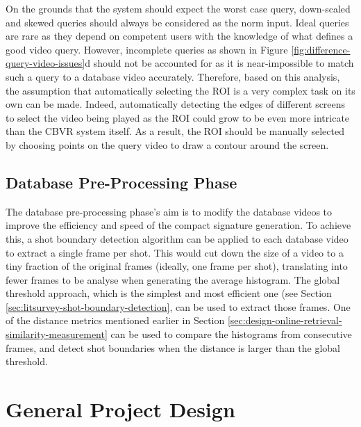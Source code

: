 On the grounds that the system should expect the worst case query, down-scaled and skewed queries should always be considered as the norm input. Ideal queries are rare as they depend on competent users with the knowledge of what defines a good video query. However, incomplete queries as shown in Figure \ref{fig:difference-query-video-issues}d should not be accounted for as it is near-impossible to match such a query to a database video accurately. Therefore, based on this analysis, the assumption that automatically selecting the ROI is a very complex task on its own can be made. Indeed, automatically detecting the edges of different screens to select the video being played as the ROI could grow to be even more intricate than the CBVR system itself. As a result, the ROI should be manually selected by choosing points on the query video to draw a contour around the screen. 


\subsection{Database Pre-Processing Phase}

The database pre-processing phase's aim is to modify the database videos to improve the efficiency and speed of the compact signature generation. To achieve this, a shot boundary detection algorithm can be applied to each database video to extract a single frame per shot. This would cut down the size of a video to a tiny fraction of the original frames (ideally, one frame per shot), translating into fewer frames to be analyse when generating the average histogram. The global threshold approach, which is the simplest and most efficient one (see Section \ref{sec:litsurvey-shot-boundary-detection}, can be used to extract those frames. One of the distance metrics mentioned earlier in Section \ref{sec:design-online-retrieval-similarity-measurement} can be used to compare the histograms from consecutive frames, and detect shot boundaries when the distance is larger than the global threshold.


\section{General Project Design}

